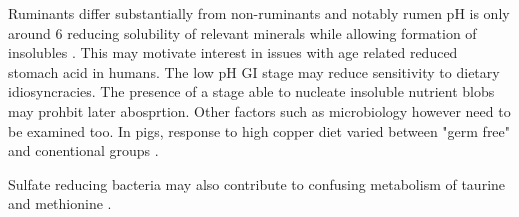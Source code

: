 {Ruminants differ substantially from non-ruminants and notably
rumen  pH is only around 6 reducing solubility
of relevant minerals while allowing formation of insolubles 
\cite{Spears_Trace_Mineral_Bioavailability_2003}.
This may motivate interest in  issues with age related reduced
stomach acid in humans. The low pH GI stage may 
reduce sensitivity to dietary idiosyncracies.  The presence of
a stage able to nucleate insoluble nutrient blobs may
prohbit later abosprtion.  
Other factors such as microbiology however need to be examined too. 
In pigs, response to high copper diet varied between "germ free"
and conentional groups 
\cite{Shurson_Ku_Waxler_Physiological_relationships_between_microbiological_1990}.


Sulfate reducing bacteria may also contribute to confusing metabolism
of taurine and methionine 
\cite{Wang_Hydrogen_sulfide_microbiota_} .

} %

